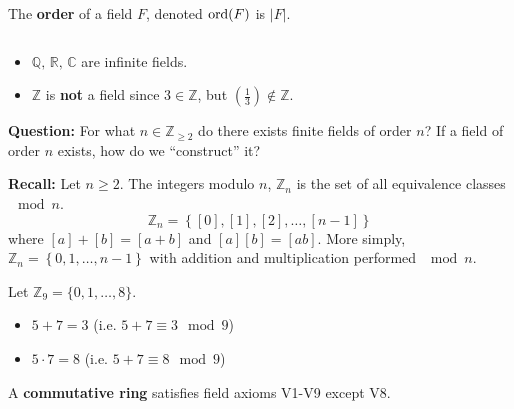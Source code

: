 \begin{defbox}
    \begin{definition}
        The \textbf{order} of a field $ F $, denoted $ \operatorname{ord}(F) $ is $ |F| $.
    \end{definition}
\end{defbox}

\begin{exbox}
    \begin{example}
        $ \; $
        \begin{itemize}
            \item $ \mathbb{Q},\,\mathbb{R},\,\mathbb{C} $ are infinite fields.
            \item $ \mathbb{Z} $ is \textbf{not} a field since $ 3\in\mathbb{Z} $, but
                  $ \left(\frac{1}{3}\right)\notin\mathbb{Z} $.
        \end{itemize}
    \end{example}
\end{exbox}

\textbf{Question:} For what $ n\in\mathbb{Z}_{\geqslant 2} $ do there exists
finite fields of order $ n $? If a field of order $ n $ exists, how do
we ``construct'' it?

\textbf{Recall:} Let $ n\geqslant 2 $. The integers modulo $ n $,
$ \mathbb{Z}_n $ is the set of all equivalence classes $ \mod n $.
\[ \mathbb{Z}_n=\left\{ [0],[1],[2],\ldots ,[n-1]\right\} \]
where $ [a]+[b]=[a+b] $ and $ [a][b]=[ab] $.
More simply, $ \mathbb{Z}_{n}=\left\{ 0,1,\ldots ,n-1\right\} $
with addition and multiplication performed $ \mod n $.

\begin{exbox}
    \begin{example}[Modulo]
        Let $ \mathbb{Z}_9=\{0,1,\ldots ,8\} $.
        \begin{itemize}
            \item $ 5+7=3 $ (i.e. $ 5+7\equiv 3 \mod 9 $)
            \item $ 5\cdot 7=8 $ (i.e. $ 5+7\equiv 8 \mod 9 $)
        \end{itemize}
    \end{example}
\end{exbox}

\begin{defbox}
    \begin{definition}
        A \textbf{commutative ring} satisfies field axioms V1-V9 except
        V8.
    \end{definition}
\end{defbox}


